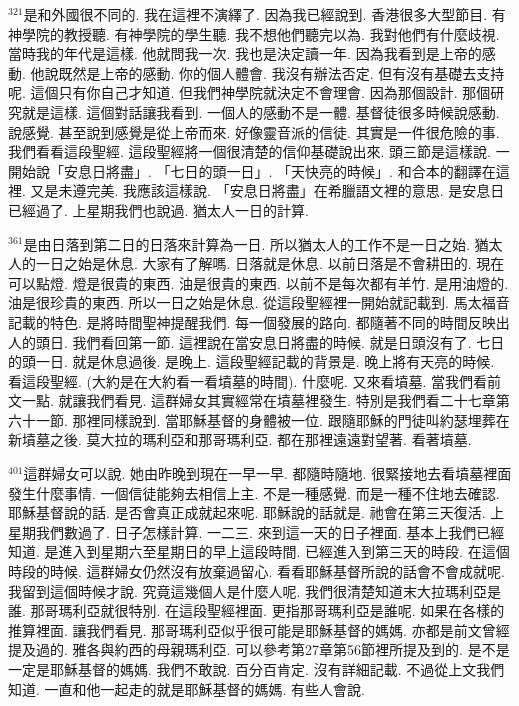 \documentclass{book}
\begin{document}
$^{321}$是和外國很不同的.
我在這裡不演繹了.
因為我已經說到.
香港很多大型節目.
有神學院的教授聽.
有神學院的學生聽.
我不想他們聽完以為.
我對他們有什麼歧視.
當時我的年代是這樣.
他就問我一次.
我也是決定讀一年.
因為我看到是上帝的感動.
他說既然是上帝的感動.
你的個人體會.
我沒有辦法否定.
但有沒有基礎去支持呢.
這個只有你自己才知道.
但我們神學院就決定不會理會.
因為那個設計.
那個研究就是這樣.
這個對話讓我看到.
一個人的感動不是一體.
基督徒很多時候說感動.
說感覺.
甚至說到感覺是從上帝而來.
好像靈音派的信徒.
其實是一件很危險的事.
我們看看這段聖經.
這段聖經將一個很清楚的信仰基礎說出來.
頭三節是這樣說.
一開始說「安息日將盡」.
「七日的頭一日」.
「天快亮的時候」.
和合本的翻譯在這裡.
又是未遵完美.
我應該這樣說.
「安息日將盡」在希臘語文裡的意思.
是安息日已經過了.
上星期我們也說過.
猶太人一日的計算.

$^{361}$是由日落到第二日的日落來計算為一日.
所以猶太人的工作不是一日之始.
猶太人的一日之始是休息.
大家有了解嗎.
日落就是休息.
以前日落是不會耕田的.
現在可以點燈.
燈是很貴的東西.
油是很貴的東西.
以前不是每次都有羊竹.
是用油燈的.
油是很珍貴的東西.
所以一日之始是休息.
從這段聖經裡一開始就記載到.
馬太福音記載的特色.
是將時間聖神提醒我們.
每一個發展的路向.
都隨著不同的時間反映出人的頭日.
我們看回第一節.
這裡說在當安息日將盡的時候.
就是日頭沒有了.
七日的頭一日.
就是休息過後.
是晚上.
這段聖經記載的背景是.
晚上將有天亮的時候.
看這段聖經.
(大約是在大約看一看墳墓的時間).
什麼呢.
又來看墳墓.
當我們看前文一點.
就讓我們看見.
這群婦女其實經常在墳墓裡發生.
特別是我們看二十七章第六十一節.
那裡同樣說到.
當耶穌基督的身體被一位.
跟隨耶穌的門徒叫約瑟埋葬在新墳墓之後.
莫大拉的瑪利亞和那哥瑪利亞.
都在那裡遠遠對望著.
看著墳墓.

$^{401}$這群婦女可以說.
她由昨晚到現在一早一早.
都隨時隨地.
很緊接地去看墳墓裡面發生什麼事情.
一個信徒能夠去相信上主.
不是一種感覺.
而是一種不住地去確認.
耶穌基督說的話.
是否會真正成就起來呢.
耶穌說的話就是.
祂會在第三天復活.
上星期我們數過了.
日子怎樣計算.
一二三.
來到這一天的日子裡面.
基本上我們已經知道.
是進入到星期六至星期日的早上這段時間.
已經進入到第三天的時段.
在這個時段的時候.
這群婦女仍然沒有放棄過留心.
看看耶穌基督所說的話會不會成就呢.
我留到這個時候才說.
究竟這幾個人是什麼人呢.
我們很清楚知道末大拉瑪利亞是誰.
那哥瑪利亞就很特別.
在這段聖經裡面.
更指那哥瑪利亞是誰呢.
如果在各樣的推算裡面.
讓我們看見.
那哥瑪利亞似乎很可能是耶穌基督的媽媽.
亦都是前文曾經提及過的.
雅各與約西的母親瑪利亞.
可以參考第27章第56節裡所提及到的.
是不是一定是耶穌基督的媽媽.
我們不敢說.
百分百肯定.
沒有詳細記載.
不過從上文我們知道.
一直和他一起走的就是耶穌基督的媽媽.
有些人會說.
\end{document}
